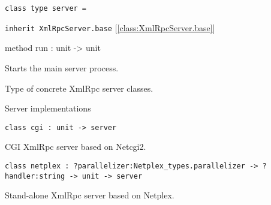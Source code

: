 \documentclass[11pt]{article}
\begin{document}
\begin{ocamldoccode}
{\tt{class type server = }}\end{ocamldoccode}
\label{classtype:XmlRpcServer.server}

\begin{ocamldocobjectend}


{\tt{inherit XmlRpcServer.base}} [\ref{class:XmlRpcServer.base}]

\label{method:XmlRpcServer.server.run}\begin{ocamldoccode}
method run : unit -> unit
\end{ocamldoccode}
\begin{ocamldocdescription}
Starts the main server process.


\end{ocamldocdescription}
\end{ocamldocobjectend}


\begin{ocamldocdescription}
Type of concrete XmlRpc server classes.


\end{ocamldocdescription}




Server implementations



\begin{ocamldoccode}
{\tt{class cgi : }}{\tt{unit -> }}{\tt{server}}\end{ocamldoccode}
\label{class:XmlRpcServer.cgi}



\begin{ocamldocdescription}
CGI XmlRpc server based on Netcgi2.


\end{ocamldocdescription}




\begin{ocamldoccode}
{\tt{class netplex : }}{\tt{?parallelizer:Netplex\_types.parallelizer -> ?handler:string -> unit -> }}{\tt{server}}\end{ocamldoccode}
\label{class:XmlRpcServer.netplex}



\begin{ocamldocdescription}
Stand-alone XmlRpc server based on Netplex.


\end{ocamldocdescription}
\end{document}
